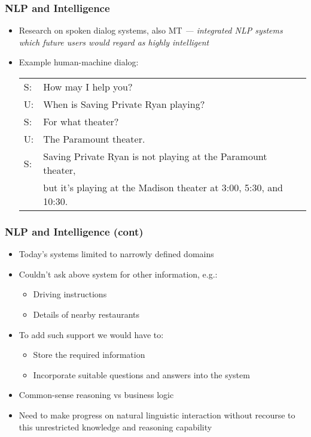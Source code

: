 \begin{frame}[fragile]\frametitle{NLP and Intelligence}
\begin{itemize}
\item Research on spoken dialog systems, also MT \emph{--- integrated NLP systems which future users would regard as highly intelligent}
\item Example human-machine dialog:
\small
\begin{tabular}{ll}
S: & How may I help you?\\
U: & When is Saving Private Ryan playing?\\
S: & For what theater?\\
U: & The Paramount theater.\\
S: & Saving Private Ryan is not playing at the Paramount theater,\\
   & but it's playing at the Madison theater at 3:00, 5:30, and 10:30. 
\end{tabular}
\end{itemize}
\end{frame}


\begin{frame}[fragile]\frametitle{NLP and Intelligence (cont)}
\begin{itemize}
\item Today's systems limited to narrowly defined domains
\item Couldn't ask above system for other information, e.g.:
  \begin{itemize}
  \item Driving instructions
  \item Details of nearby restaurants
  \end{itemize}
\item To add such support we would have to:
  \begin{itemize}
  \item Store the required information
  \item Incorporate suitable questions and answers into the system
  \end{itemize}
\item Common-sense reasoning vs business logic
\item Need to make progress on natural linguistic interaction without recourse to this unrestricted knowledge and reasoning capability
\end{itemize}
\end{frame}


